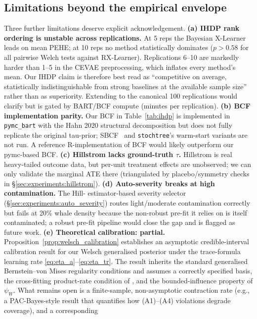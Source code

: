 \subsection{Limitations beyond the empirical envelope}
\label{sec:discussion:limitations}
Three further limitations deserve explicit acknowledgement.
\textbf{(a) IHDP rank ordering is unstable across replications.}
At 5 reps the Bayesian X-Learner leads on mean PEHE; at 10 reps no
method statistically dominates ($p > 0.58$ for all pairwise Welch
tests against RX-Learner). Replications 6--10 are markedly harder
than 1--5 in the CEVAE preprocessing, which inflates every method's
mean. Our IHDP claim is therefore best read as ``competitive on
average, statistically indistinguishable from strong baselines at
the available sample size'' rather than as superiority. Extending
to the canonical 100 replications would clarify but is gated by
BART/BCF compute (minutes per replication).
\textbf{(b) BCF implementation parity.} Our BCF in
Table~\ref{tab:ihdp} is implemented in \texttt{pymc\_bart} with the
Hahn 2020 structural decomposition but does not fully replicate the
original tau-prior; SBCF~\citep{caron2022shrinkage} and
\texttt{stochtree}'s warm-start variants are not run. A reference
R-implementation of BCF would likely outperform our pymc-based BCF.
\textbf{(c) Hillstrom lacks ground-truth $\tau$.} Hillstrom is real
heavy-tailed outcome data, but per-unit treatment effects are
unobserved; we can only validate the marginal ATE there
(triangulated by placebo/symmetry checks in
\S\ref{sec:experiments:hillstrom}).
\textbf{(d) Auto-severity breaks at high contamination.} The Hill-
estimator-based severity selector
(\S\ref{sec:experiments:auto_severity}) routes light/moderate
contamination correctly but fails at 20\% whale density because the
non-robust pre-fit it relies on is itself contaminated; a robust
pre-fit pipeline would close the gap and is flagged as future work.
\textbf{(e) Theoretical calibration: partial.}
Proposition~\ref{prop:welsch_calibration} establishes an asymptotic
credible-interval calibration result for our Welsch generalised
posterior under the trace-formula learning rate
\eqref{eq:eta_a}--\eqref{eq:eta_tr}. The result inherits the standard generalised
Bernstein--von Mises regularity conditions and assumes a correctly
specified basis, the cross-fitting product-rate condition of
\citet{kennedy2020optimal}, and the bounded-influence property of
$\psi_W$. What remains open is a finite-sample, non-asymptotic
contraction rate (e.g., a PAC-Bayes-style result that quantifies
how (A1)--(A4) violations degrade coverage), and a corresponding
